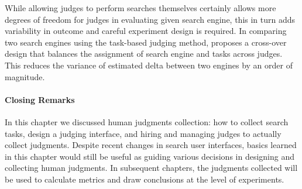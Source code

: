 While allowing judges to perform searches themselves certainly allows more degrees of freedom for judges in evaluating given search engine, this in turn adds variability in outcome and careful experiment design is required. In comparing two search engines using the task-based judging method, \cite{Xu:2009} proposes a cross-over design that balances the assignment of search engine and tasks across judges. This reduces the variance of estimated delta between two engines by an order of magnitude. 



\paragraph{Closing Remarks} 
In this chapter we discussed human judgments collection: how to collect search tasks, design a judging interface, and hiring and managing judges to actually collect judgments. Despite recent changes in search user interfaces, basics learned in this chapter would still be useful as guiding various decisions in designing and collecting human judgments. In subsequent chapters, the judgments collected will be used to calculate metrics and draw conclusions at the level of experiments. 

